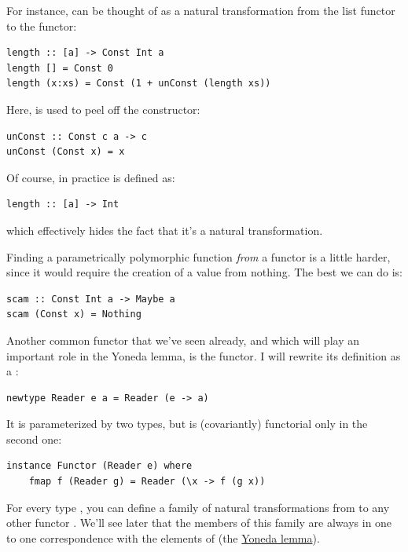 For instance,  can be thought of as a natural
transformation from the list functor to the  functor:

\begin{Verbatim}[commandchars=\\\{\}]
length :: [a] -> Const Int a
length [] = Const 0
length (x:xs) = Const (1 + unConst (length xs))
\end{Verbatim}
Here,  is used to peel off the 
constructor:

\begin{Verbatim}[commandchars=\\\{\}]
unConst :: Const c a -> c
unConst (Const x) = x
\end{Verbatim}
Of course, in practice  is defined as:

\begin{Verbatim}[commandchars=\\\{\}]
length :: [a] -> Int
\end{Verbatim}
which effectively hides the fact that it's a natural transformation.

Finding a parametrically polymorphic function \emph{from} a
 functor is a little harder, since it would require the
creation of a value from nothing. The best we can do is:

\begin{Verbatim}[commandchars=\\\{\}]
scam :: Const Int a -> Maybe a
scam (Const x) = Nothing
\end{Verbatim}
Another common functor that we've seen already, and which will play an
important role in the Yoneda lemma, is the  functor. I
will rewrite its definition as a :

\begin{Verbatim}[commandchars=\\\{\}]
newtype Reader e a = Reader (e -> a)
\end{Verbatim}
It is parameterized by two types, but is (covariantly) functorial only
in the second one:

\begin{Verbatim}
instance Functor (Reader e) where
    fmap f (Reader g) = Reader (\x -> f (g x))
\end{Verbatim}
For every type , you can define a family of natural
transformations from  to any other functor .
We'll see later that the members of this family are always in one to one
correspondence with the elements of  (the
\hyperref[the-yoneda-lemma]{Yoneda lemma}).

